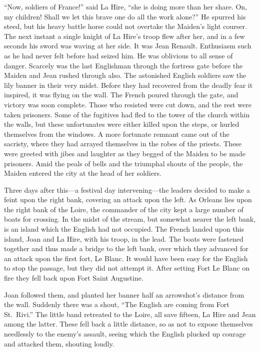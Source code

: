 ``Now, soldiers of France!'' said La Hire, ``she is doing more than her
share. On, my children! Shall we let this brave one do all the work
alone?'' He spurred his steed, but his heavy battle horse could not
overtake the Maiden's light courser. The next instant a single knight of
La Hire's troop flew after her, and in a few seconds his sword was
waving at her side. It was Jean Renault. Enthusiasm such as he had never
felt before had seized him. He was oblivious to all sense of danger.
Scarcely was the last Englishman through the fortress gate before the
Maiden and Jean rushed through also. The astonished English soldiers saw
the lily banner in their very midst. Before they had recovered from the
deadly fear it inspired, it was flying on the wall. The French poured
through the gate, and victory was soon complete. Those who resisted were
cut down, and the rest were taken prisoners. Some of the fugitives had
fled to the tower of the church within the walls, but these unfortunates
were either killed upon the steps, or hurled themselves from the
windows. A more fortunate remnant came out of the sacristy, where they
had arrayed themselves in the robes of the priests. These were greeted
with jibes and laughter as they begged of the Maiden to be made
prisoners. Amid the peals of bells and the triumphal shouts of the
people, the Maiden entered the city at the head of her soldiers.

Three days after this---a festival day intervening---the leaders decided
to make a feint upon the right bank, covering an attack upon the left.
As Orleans lies upon the right bank of the Loire, the commander of the
city kept a large number of boats for crossing. In the midst of the
stream, but somewhat nearer the left bank, is an island which the
English had not occupied. The French landed upon this island, Joan and
La Hire, with his troop, in the lead. The boats were fastened together
and thus made a bridge to the left bank, over which they advanced for an
attack upon the first fort, Le Blanc. It would have been easy for the
English to stop the passage, but they did not attempt it. After setting
Fort Le Blanc on fire they fell back upon Fort Saint Augustine.

Joan followed them, and planted her banner half an arrowshot's distance
from the wall. Suddenly there was a shout, ``The English are coming from
Fort St.~Rivi.'' The little band retreated to the Loire, all save
fifteen, La Hire and Jean among the latter. These fell back a little
distance, so as not to expose themselves needlessly to the enemy's
assault, seeing which the English plucked up courage and attacked them,
shouting loudly.

